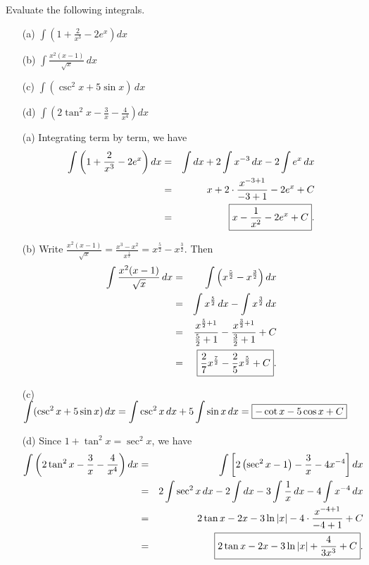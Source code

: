 \documentclass[12pt]{article}
\newenvironment{examples}{\noindent{\bf Examples }}{\vspace{0mm}}
\newenvironment{solution}{\noindent{\it Solution}}{\vspace{2mm}}
\newcommand{\ds}{\displaystyle}
\begin{document}
\begin{enumerate}
\vspace{0.3cm}

\begin{examples}
Evaluate the following integrals.
\begin{enumerate}
\item[(a)]
$\ds \int \left(1 + \frac{2}{x^3} - 2e^x\right) dx$
\item[(b)]
$\ds \int \frac{x^2(x - 1)}{\sqrt{x}} \, dx$
\item[(c)]
$\ds \int (\csc^2 x + 5\sin x) \, dx$
\item[(d)]
$\ds \int \left(2\tan^2 x - \frac{3}{x} - \frac{4}{x^4}\right) dx$
\end{enumerate}

\vspace{0.2cm}

\begin{solution}
\begin{enumerate}
\item[(a)]
Integrating term by term, we have
\begin{eqnarray*}
\int \left(1 + \frac{2}{x^3} - 2e^x\right) dx & = & \int dx + 2\int x^{-3} \, dx - 2\int e^x \, dx \\
& = & x + 2 \cdot \frac{x^{-3 + 1}}{-3 + 1} - 2e^x + C \\
& = & \fbox{$\ds x - \frac{1}{x^2}  - 2e^x + C$}.
\end{eqnarray*}
\item[(b)]
Write $\ds \frac{x^2(x - 1)}{\sqrt{x}} = \frac{x^3 - x^2}{x^{\frac{1}{2}}} = x^{\frac{5}{2}} - x^{\frac{3}{2}}$. Then
\begin{eqnarray*}
\int \frac{x^2(x - 1)}{\sqrt{x}} \, dx & = & \int \left(x^{\frac{5}{2}} - x^{\frac{3}{2}}\right) dx \\
& = & \int x^{\frac{5}{2}} \, dx - \int x^{\frac{3}{2}} \, dx \\
& = & \frac{x^{\frac{5}{2} + 1}}{\frac{5}{2} + 1} - \frac{x^{\frac{3}{2} + 1}}{\frac{3}{2} + 1} + C \\
& = & \fbox{$\ds \frac{2}{7}x^{\frac{7}{2}} - \frac{2}{5}x^{\frac{5}{2}} + C$}.
\end{eqnarray*}
\item[(c)]
$\ds \int (\csc^2 x + 5\sin x) \, dx = \int \csc^2 x \, dx + 5\int \sin x\, dx = \fbox{$\ds -\cot x - 5\cos x + C$}$
\item[(d)]
Since $1 + \tan^2 x = \sec^2 x$, we have
\begin{eqnarray*}
\int \left(2\tan^2 x - \frac{3}{x} - \frac{4}{x^4}\right) dx & = & \int \left[2\left(\sec^2 x - 1\right) - \frac{3}{x} - 4x^{-4}\right] dx \\
& = & 2\int \sec^2 x \, dx - 2\int dx - 3\int \frac{1}{x}\,dx - 4\int x^{-4}\,dx \\
& = & 2\tan x - 2x - 3\ln|x| - 4 \cdot \frac{x^{-4+1}}{-4+1} + C \\
& = & \fbox{$\ds 2\tan x - 2x - 3\ln|x| + \frac{4}{3x^3} + C$}.
\end{eqnarray*}
\end{enumerate}
\end{solution}
\end{examples}


\end{enumerate}
\end{document}
